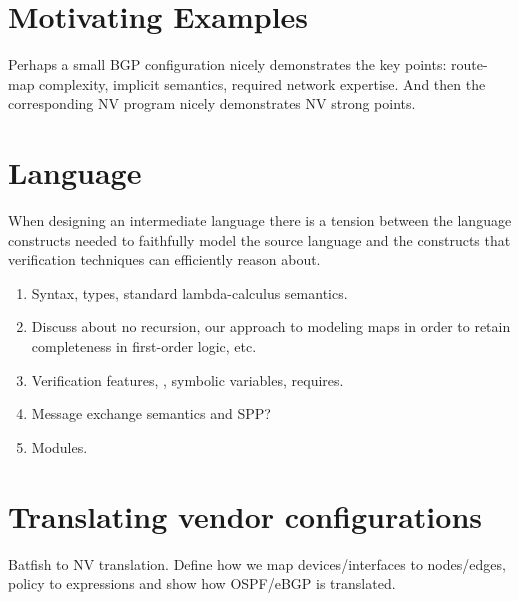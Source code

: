 \documentclass[sigconf,10pt]{acmart}
\begin{document}
%
%
%
%

\section{Motivating Examples} 
\label{sec:motivation}

Perhaps a small BGP configuration nicely demonstrates the key points: route-map complexity, implicit semantics, required network expertise.
And then the corresponding NV program nicely demonstrates NV strong points.

%
%
%
%

\section{Language} 
\label{sec:language}

When designing an intermediate language there is a tension between the language
constructs needed to faithfully model the source language and the constructs
that verification techniques can efficiently reason about.
\begin{enumerate}
  \item Syntax, types, standard lambda-calculus semantics.
  \item Discuss about no recursion, our approach to modeling maps in order to retain completeness in first-order logic, etc.
  \item Verification features, \EG, symbolic variables, requires.
  \item Message exchange semantics and SPP?
  \item Modules.
\end{enumerate}

%
%
%
%

\section{Translating vendor configurations}
\label{sec:translation}

Batfish to NV translation. Define how we map devices/interfaces to nodes/edges,
policy to expressions and show how OSPF/eBGP is translated.
\end{document}
